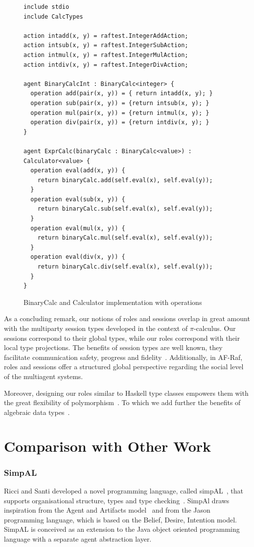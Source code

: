 \documentclass[a4paper,12pt,oneside,fleqn]{book} %
\begin{document}
\begin{figure}\footnotesize %
\begin{verbatim}
include stdio
include CalcTypes

action intadd(x, y) = raftest.IntegerAddAction;
action intsub(x, y) = raftest.IntegerSubAction;
action intmul(x, y) = raftest.IntegerMulAction;
action intdiv(x, y) = raftest.IntegerDivAction;

agent BinaryCalcInt : BinaryCalc<integer> {
  operation add(pair(x, y)) = { return intadd(x, y); }
  operation sub(pair(x, y)) = {return intsub(x, y); }
  operation mul(pair(x, y)) = {return intmul(x, y); }
  operation div(pair(x, y)) = {return intdiv(x, y); }
}

agent ExprCalc(binaryCalc : BinaryCalc<value>) : Calculator<value> {
  operation eval(add(x, y)) {
    return binaryCalc.add(self.eval(x), self.eval(y));
  }
  operation eval(sub(x, y)) {
    return binaryCalc.sub(self.eval(x), self.eval(y));
  }
  operation eval(mul(x, y)) {
    return binaryCalc.mul(self.eval(x), self.eval(y));
  }
  operation eval(div(x, y)) {
    return binaryCalc.div(self.eval(x), self.eval(y));
  }
}
\end{verbatim}
\caption{BinaryCalc and Calculator implementation with operations}
\label{fig:calc-op}
\end{figure} %

As a concluding remark, our notions of roles and sessions overlap in great
amount with the multiparty session types developed in the context of
$\pi$-calculus. Our sessions correspond to their global types, while our
roles correspond with their local type projections. The benefits of session
types are well known, they facilitate communication safety, progress and
fidelity~\cite{dblp:conf/popl/hondayc08}. Additionally, in AF-Raf, roles and
sessions offer a structured global perspective regarding the social level
of the multiagent systems.

Moreover, designing our roles similar to Haskell type classes empowers them
with the great flexibility of polymorphism~\cite{DBLP:conf/popl/WadlerB89}.
To which we add further the benefits of algebraic data
types~\cite{DBLP:journals/acta/GuttagH78}.

\section{Comparison with Other Work}\label{ch:related} %

\subsubsection{SimpAL} %
Ricci  and Santi developed a novel programming language, called
simpAL~\cite{DBLP:conf/oopsla/RicciS11,DBLP:conf/oopsla/RicciS12}, that
supports organisational structure, types and type
checking~\cite{DBLP:conf/promas/RicciS12}. SimpAl draws inspiration from
the Agent and Artifacts model~\cite{DBLP:conf/atal/RicciVO07} and from the
Jason programming language, which is based on the Belief, Desire, Intention
model. SimpAL is conceived as an extension to the Java object oriented
programming language with a separate agent abstraction layer.
\end{document}
